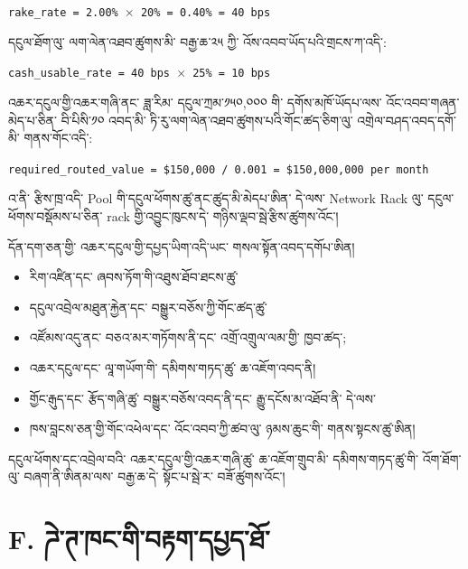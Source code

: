 \documentclass[11pt]{article}
\begin{document}
\texttt{rake\_rate = 2.00\% $\times$ 20\% = 0.40\% = 40 bps}

དངུལ་ཐོག་ལུ་ ལག་ལེན་འཐབ་ཚུགས་མི་ བརྒྱ་ཆ་༢༥ ཀྱི་ འོས་འབབ་ཡོད་པའི་གྲངས་ཀ་འདི་:

\texttt{cash\_usable\_rate = 40 bps $\times$ 25\% = 10 bps}

འཆར་དངུལ་གྱི་འཆར་གཞི་ནང་ ཟླ་རིམ་ དངུལ་ཀྲམ་༡༥༠,༠༠༠ གི་ དགོས་མཁོ་ཡོདཔ་ལས་ འོང་འབབ་གཞན་མེད་པ་ཅིན་ བི་པིསི་༡༠ འབད་མི་ ཏི་རུ་ལག་ལེན་འཐབ་ཚུགས་པའི་གོང་ཚད་ཅིག་ལུ་ འགྲེལ་བཤད་འབད་དགོ་མི་ གནས་གོང་འདི་:

\texttt{required\_routed\_value = \$150,000 / 0.001 = \$150,000,000 per month}

འ་ནི་ རྩིས་ཁྲ་འདི་ Pool གི་དངུལ་ཕོགས་ཚུ་ནང་ཚུད་མི་མེདཔ་ཨིན་ དེ་ལས་ Network Rack ལུ་ དངུལ་ཕོགས་བསྡོམས་པ་ཅིན་ rack གྱི་འབྱུང་ཁུངས་དེ་ གཉིས་ལྡབ་སྦེ་རྩིས་ཚུགས་འོང་།

དོན་དག་ཅན་གྱི་ འཆར་དངུལ་གྱི་དཔྱད་ཡིག་འདི་ཡང་ གསལ་སྟོན་འབད་དགོཔ་ཨིན།

\begin{itemize}[leftmargin=*]
\item རིག་འཛིན་དང་ ཞབས་ཏོག་གི་འཐུས་ཐོབ་ཐངས་ཚུ་
\item དངུལ་འབྲེལ་མཐུན་རྐྱེན་དང་ བསྒྱུར་བཅོས་ཀྱི་གོང་ཚད་ཚུ་
\item འཛོམས་འདུ་ནང་ བཅའ་མར་གཏོགས་ནི་དང་ འགྲོ་འགྲུལ་ལམ་གྱི་ ཁྱབ་ཚད་;
\item འཆར་དངུལ་དང་ ལཱ་གཡོག་གི་ དམིགས་གཏད་ཚུ་ ཆ་འཇོག་འབད་ནི།
\item གྱོང་རྒུད་དང་ རྩོད་གཞི་ཚུ་ བསྒྱུར་བཅོས་འབད་ནི་དང་ རྒྱུ་དངོས་མ་འཐོབ་ནི་ དེ་ལས་
\item ཁས་བླངས་ཅན་གྱི་གོང་འཕེལ་དང་ འོང་འབབ་ཀྱི་ཚབ་ལུ་ ཉམས་ཆུང་གི་ གནས་སྟངས་ཚུ་ཨིན།
\end{itemize}
དངུལ་ཕོགས་དང་འབྲེལ་བའི་ འཆར་དངུལ་གྱི་འཆར་གཞི་ཚུ་ ཆ་འཇོག་གྲུབ་མི་ དམིགས་གཏད་ཚུ་གི་ འོག་ཐོག་ལུ་ བཞག་ནི་ཨིནམ་ལས་ བརྒྱ་ཆ་དེ་ སྟོང་པ་སྦེ་ར་ བཟོ་ཚུགས་འོང་།


\section*{F. ཌེ་ཊ་ཁང་གི་བརྟག་དཔྱད་ཐོ་}
\end{document}
